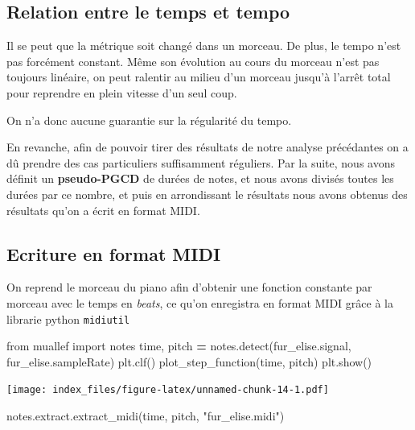 \documentclass[]{article}
\newenvironment{Shaded}{\begin{snugshade}}{\end{snugshade}}
\newcommand{\ImportTok}[1]{#1}
\newcommand{\NormalTok}[1]{#1}
\newcommand{\OperatorTok}[1]{\textcolor[rgb]{0.81,0.36,0.00}{\textbf{#1}}}
\newcommand{\StringTok}[1]{\textcolor[rgb]{0.31,0.60,0.02}{#1}}
\begin{document}
\hypertarget{relation-entre-le-temps-et-tempo}{%
\subsection{Relation entre le temps et
tempo}\label{relation-entre-le-temps-et-tempo}}

Il se peut que la métrique soit changé dans un morceau. De plus, le
tempo n'est pas forcément constant. Même son évolution au cours du
morceau n'est pas toujours linéaire, on peut ralentir au milieu d'un
morceau jusqu'à l'arrêt total pour reprendre en plein vitesse d'un seul
coup.

On n'a donc aucune guarantie sur la régularité du tempo.

En revanche, afin de pouvoir tirer des résultats de notre analyse
précédantes on a dû prendre des cas particuliers suffisamment réguliers.
Par la suite, nous avons définit un \textbf{pseudo-PGCD} de durées de
notes, et nous avons divisés toutes les durées par ce nombre, et puis en
arrondissant le résultats nous avons obtenus des résultats qu'on a écrit
en format MIDI.

\hypertarget{ecriture-en-format-midi}{%
\subsection{Ecriture en format MIDI}\label{ecriture-en-format-midi}}

On reprend le morceau du piano afin d'obtenir une fonction constante par
morceau avec le temps en \emph{beats}, ce qu'on enregistra en format
MIDI grâce à la librarie python \texttt{midiutil}

\begin{Shaded}
\begin{Highlighting}[]
\ImportTok{from}\NormalTok{ muallef }\ImportTok{import}\NormalTok{ notes}
\NormalTok{time, pitch }\OperatorTok{=}\NormalTok{ notes.detect(fur_elise.signal, fur_elise.sampleRate)}
\NormalTok{plt.clf()}
\NormalTok{plot_step_function(time, pitch)}
\NormalTok{plt.show()}
\end{Highlighting}
\end{Shaded}

\texttt{[image: index\_files/figure-latex/unnamed-chunk-14-1.pdf]}

\begin{Shaded}
\begin{Highlighting}[]
\NormalTok{notes.extract.extract_midi(time, pitch, }\StringTok{"fur_elise.midi"}\NormalTok{)}
\end{Highlighting}
\end{Shaded}
\end{document}
